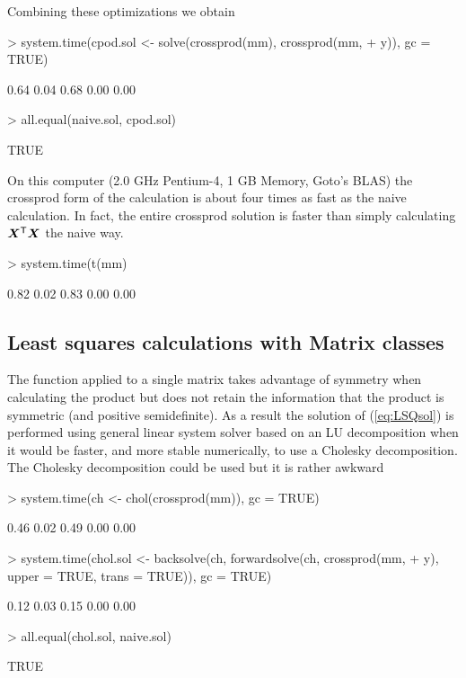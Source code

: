 \documentclass{article}
\begin{document}
Combining these optimizations we obtain
\begin{Schunk}
\begin{Sinput}
> system.time(cpod.sol <- solve(crossprod(mm), crossprod(mm, 
+     y)), gc = TRUE)
\end{Sinput}
\begin{Soutput}
[1] 0.64 0.04 0.68 0.00 0.00
\end{Soutput}
\begin{Sinput}
> all.equal(naive.sol, cpod.sol)
\end{Sinput}
\begin{Soutput}
[1] TRUE
\end{Soutput}
\end{Schunk}

On this computer (2.0 GHz Pentium-4, 1 GB Memory, Goto's BLAS) the
crossprod form of the calculation is about four times as fast as the
naive calculation.  In fact, the entire crossprod solution is
faster than simply calculating $\bm{X}^\mathsf{T}\bm{X}$ the naive way.
\begin{Schunk}
\begin{Sinput}
> system.time(t(mm) %*% mm, gc = TRUE)
\end{Sinput}
\begin{Soutput}
[1] 0.82 0.02 0.83 0.00 0.00
\end{Soutput}
\end{Schunk}

\subsection{Least squares calculations with Matrix classes}
\label{sec:MatrixLSQ}

The  function applied to a single matrix takes
advantage of symmetry when calculating the product but does not retain
the information that the product is symmetric (and positive
semidefinite).  As a result the solution of (\ref{eq:LSQsol}) is
performed using general linear system solver based on an LU
decomposition when it would be faster, and more stable numerically, to
use a Cholesky decomposition.  The Cholesky decomposition could be used
but it is rather awkward
\begin{Schunk}
\begin{Sinput}
> system.time(ch <- chol(crossprod(mm)), gc = TRUE)
\end{Sinput}
\begin{Soutput}
[1] 0.46 0.02 0.49 0.00 0.00
\end{Soutput}
\begin{Sinput}
> system.time(chol.sol <- backsolve(ch, forwardsolve(ch, crossprod(mm, 
+     y), upper = TRUE, trans = TRUE)), gc = TRUE)
\end{Sinput}
\begin{Soutput}
[1] 0.12 0.03 0.15 0.00 0.00
\end{Soutput}
\begin{Sinput}
> all.equal(chol.sol, naive.sol)
\end{Sinput}
\begin{Soutput}
[1] TRUE
\end{Soutput}
\end{Schunk}
\end{document}

